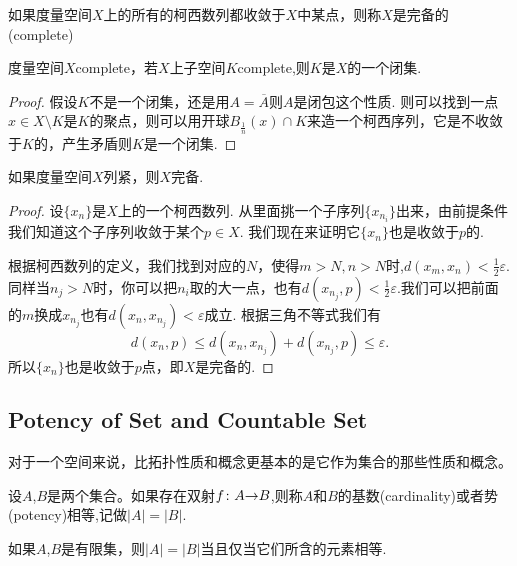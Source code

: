\begin{definition}[完备性]
如果度量空间$X$上的所有的柯西数列都收敛于$X$中某点，则称$X$是完备的(complete)
\end{definition}

\begin{proposition}
度量空间$X$complete，若$X$上子空间$K$complete,则$K$是$X$的一个闭集.
\end{proposition}

\begin{proof}
假设$K$不是一个闭集，还是用$A = \overline{A}$则$A$是闭包这个性质. 则可以找到一点$x \in  X \setminus K$是$K$的聚点，则可以用开球$B_\frac{1}{n}(x) \cap K$来造一个柯西序列，它是不收敛于$K$的，产生矛盾则$K$是一个闭集.
\end{proof}

\begin{proposition}
如果度量空间$X$列紧，则$X$完备.
\end{proposition}

\begin{proof}
设$\{x_n\}$是$X$上的一个柯西数列. 从里面挑一个子序列$\{x_{n_i}\}$出来，由前提条件我们知道这个子序列收敛于某个$p \in X$. 我们现在来证明它$\{x_n\}$也是收敛于$p$的.

根据柯西数列的定义，我们找到对应的$N$，使得$m > N,n >N$时,$d(x_m,x_n) < \frac{1}{2}\varepsilon$. 同样当$n_j > N$时，你可以把$n_i$取的大一点，也有$d(x_{n_j},p) < \frac{1}{2}\varepsilon$.我们可以把前面的$m$换成$x_{n_j}$也有$d(x_n,x_{n_j})< \varepsilon$成立. 根据三角不等式我们有\[d(x_n,p) \leq d(x_n,x_{n_j}) + d(x_{n_j},p) \leq \varepsilon.\]所以$\{x_n\}$也是收敛于$p$点，即$X$是完备的.
\end{proof}

\newpage
\subsection{Potency of Set and Countable Set}

对于一个空间来说，比拓扑性质和概念更基本的是它作为集合的那些性质和概念。

\begin{definition}
设$A$,$B$是两个集合。如果存在双射${f}\colon{A}{\to}{B}$,则称$A$和$B$的基数(cardinality)或者势(potency)相等,记做$|A|=|B|$.
\end{definition}

\begin{lemma}
如果$A$,$B$是有限集，则$|A|=|B|$当且仅当它们所含的元素相等.
\end{lemma}

